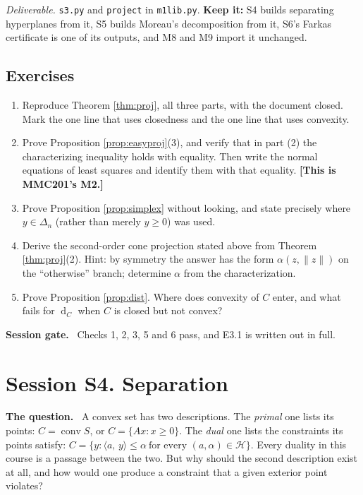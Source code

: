 \documentclass[11pt,a4paper]{article}
\newcommand{\mpart}[1]{\smallskip\noindent\textbf{#1}\ \ignorespaces}
\theoremstyle{definition}
\theoremstyle{plain}
\theoremstyle{remark}
\newcommand{\ip}[2]{\langle #1,\, #2\rangle}
\newcommand{\norm}[1]{\lVert #1\rVert}
\DeclareMathOperator{\conv}{conv}
\DeclareMathOperator{\dist}{d}
\newcommand{\Simplex}{\Delta}
\begin{document}
\emph{Deliverable.} \texttt{s3.py} and \texttt{project} in \texttt{m1lib.py}. \textbf{Keep it:}
S4 builds separating hyperplanes from it, S5 builds Moreau's decomposition from it, S6's Farkas
certificate is one of its outputs, and M8 and M9 import it unchanged.

\subsection*{Exercises}
\begin{enumerate}[label=E3.\arabic*]
\item Reproduce Theorem \ref{thm:proj}, all three parts, with the document closed. Mark the one
line that uses closedness and the one line that uses convexity.
\item Prove Proposition \ref{prop:easyproj}(3), and verify that in part (2) the characterizing
inequality holds with equality. Then write the normal equations of least squares and identify
them with that equality. \textbf{[This is MMC201's M2.]}
\item Prove Proposition \ref{prop:simplex} without looking, and state precisely where
$y\in\Simplex_n$ (rather than merely $y\ge0$) was used.
\item Derive the second-order cone projection stated above from Theorem \ref{thm:proj}(2).
Hint: by symmetry the answer has the form $\alpha(z,\norm z)$ on the ``otherwise'' branch;
determine $\alpha$ from the characterization.
\item Prove Proposition \ref{prop:dist}. Where does convexity of $C$ enter, and what fails for
$\dist_C$ when $C$ is closed but not convex?
\end{enumerate}

\mpart{Session gate.} Checks 1, 2, 3, 5 and 6 pass, and E3.1 is written out in full.

\clearpage

\section{Session S4. Separation}

\mpart{The question.} A convex set has two descriptions. The \emph{primal} one lists its points:
$C=\conv S$, or $C=\{Ax:x\ge0\}$. The \emph{dual} one lists the constraints its points satisfy:
$C=\{y:\ip{a}{y}\le\alpha\ \text{for every } (a,\alpha)\in\mathcal H\}$. Every duality in this
course is a passage between the two. But why should the second description exist at all, and
how would one produce a constraint that a given exterior point violates?
\end{document}
